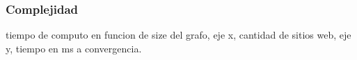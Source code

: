 \subsubsection{Complejidad}
tiempo de computo en funcion de size del grafo, eje x, cantidad de sitios web, eje y, tiempo en ms a convergencia.